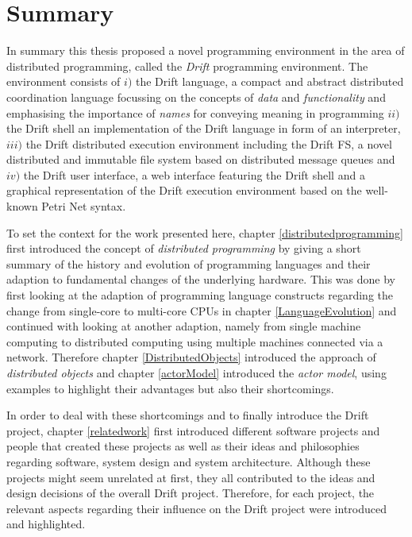 \section{Summary}
\label{summary}

In summary this thesis proposed a novel programming environment
in the area of distributed programming, called the
\textit{Drift} programming environment. The environment consists
of $i)$ the Drift language, a compact and abstract distributed
coordination language focussing on the concepts of
\textit{data} and \textit{functionality} and emphasising
the importance of \textit{names} for conveying
meaning in programming $ii)$ the Drift shell an implementation
of the Drift language in form of an interpreter,
$iii)$ the Drift distributed execution
environment including the Drift FS, a novel distributed and
immutable file system based on distributed message queues and
$iv)$ the Drift user interface, a web interface featuring
the Drift shell and a graphical representation of the
Drift execution environment based on the well-known
Petri Net syntax.
\newline

To set the context for the work presented here,
chapter \ref{distributedprogramming} first introduced the concept of
\textit{distributed programming} by giving a short summary of the
history and evolution of programming languages and their adaption to
fundamental changes of the underlying hardware. This was done by first
looking at the adaption of programming language constructs regarding
the change from single-core to multi-core CPUs in chapter
\ref{LanguageEvolution}
and continued with looking at another adaption, namely from single
machine computing to distributed computing using multiple machines
connected via a network. Therefore chapter \ref{DistributedObjects}
introduced the approach of \textit{distributed objects} and
chapter \ref{actorModel} introduced the \textit{actor model},
using examples to highlight their advantages but also their shortcomings.
\newline

In order to deal with these shortcomings and to finally introduce
the Drift project, chapter \ref{relatedwork} first introduced
different software projects and people that
created these projects as well as their ideas and philosophies
regarding software, system design and system architecture. Although these
projects might seem unrelated at first, they all contributed
to the ideas and design decisions of the overall Drift project.
Therefore, for each project, the relevant aspects regarding
their influence on the Drift project were introduced and highlighted.

